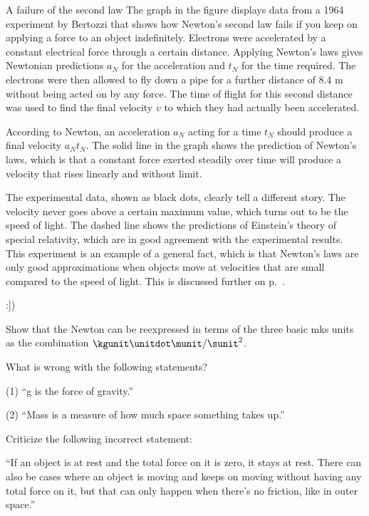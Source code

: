 \begin{eg}{A failure of the second law}\label{eg:bertozzi-graph}
The graph in the figure displays data from a 1964 experiment by Bertozzi that
shows how Newton's second law fails if you keep on applying a force to an object indefinitely.
Electrons were accelerated by a constant electrical force through a certain distance.
Applying Newton's laws
gives Newtonian predictions $a_N$ for the acceleration and $t_N$ for the time 
required.
The electrons were then allowed to fly down a pipe for a further distance of 8.4 m
without being acted on by any force. The time of flight for this second distance
was used to find the final
velocity $v$ to which they had actually been accelerated.

According to Newton, an acceleration $a_N$ acting for a time $t_N$ should produce a final velocity
$a_N t_N$. The solid line in the
graph shows the prediction of Newton's laws, which is that a constant force exerted steadily over
time will produce a velocity that rises linearly and without limit.

The experimental data, shown as black dots, clearly tell a different story. The velocity never goes
above a certain maximum value, which turns out to be the speed of light.
The dashed line shows the predictions of Einstein's theory of special relativity, which
are in good agreement with the experimental results. This experiment is an example of
a general fact, which is that Newton's laws are only good approximations when objects
move at velocities that are small compared to the speed of light. This is discussed further
on p.~\pageref{subsec:tests-of-second-law}.
\end{eg}
:])

\startdqs

\begin{dq}
Show that the Newton can be reexpressed in terms of the
three basic mks units as the combination $\kgunit\unitdot\munit/\sunit^2$.
\end{dq}

\begin{dq}
What is wrong with the following statements?

    (1) ``g is the force of gravity.''

    (2) ``Mass is a measure of how much space something takes up.''
\end{dq}

\begin{dq}
Criticize the following incorrect statement:

``If an object is at rest and the total force on it is zero,
it stays at rest. There can also be cases where an object is
moving and keeps on moving without having any total force on
it, but that can only happen when there's no friction,
like in outer space.''
\end{dq}

